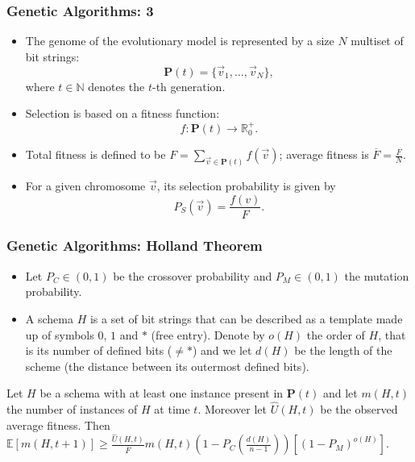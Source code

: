 \documentclass{beamer}
\begin{document}
\begin{frame}
\frametitle{Genetic Algorithms: 3}
\begin{itemize}
\item
The genome of the evolutionary model is represented by a size $N$ multiset of bit strings:
\begin{equation*}
\textbf{P}(t) = \{\vec{v}_1, \dots, \vec{v}_N \},
\end{equation*}
where $t \in \mathbb{N}$ denotes the $t$-th generation.

\item Selection is based on a fitness function:
\begin{equation*}
f: \textbf{P}(t) \longrightarrow \mathbb{R}_0^{+}.
\end{equation*}
\item Total fitness is defined to be $F = \sum_{\vec{v}\in \textbf{P}(t)}f(\vec{v})$; average fitness is $\overline{F} = \frac{F}{N}.$
\item For a given chromosome $\vec{v}$, its selection probability is given by
\begin{equation*}
P_S(\vec{v}) = \frac{f(v)}{F}.
\end{equation*}
\end{itemize}
\end{frame}

\begin{frame}
\frametitle{Genetic Algorithms: Holland Theorem}
\begin{itemize}
\item Let $P_C \in (0,1)$ be the crossover probability and $P_M \in (0,1)$ the mutation probability. 
\item A schema $H$ is a set of bit strings that can be described as a template made up of symbols $0$, $1$ and $*$ (free entry). Denote by $o(H)$ the order of $H$, that is its number of defined bits ($\neq *$) and we let $d(H)$ be the length of the scheme (the distance between its outermost defined bits).
\end{itemize}
\begin{theorem}
Let $H$ be a schema with at least one instance present in $\textbf{P}(t)$ and let $m(H,t)$ the number of instances of $H$ at time $t$. Moreover let $\hat{U}(H,t)$ be the observed average fitness. Then $\mathbb{E}\left[m(H, t + 1) \right] \geq \frac{\hat{U}(H,t)}{\overline{F}}m(H,t)\left( 1 - P_C\left(\frac{d(H)}{n-1} \right)\right)\left[ (1-P_M)^{o(H)}\right].$

\end{theorem}
\end{frame}
\end{document}
